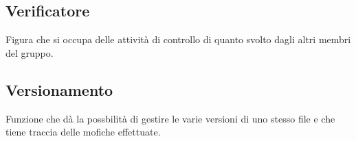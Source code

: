 \documentclass[../glossario.tex]{subfiles}
\begin{document}
\subsection*{Verificatore} 
Figura che si occupa delle attività di controllo di quanto svolto dagli altri membri del gruppo.

\subsection*{Versionamento} 
Funzione che dà la possbilità di gestire le varie versioni di uno stesso file e che tiene traccia delle mofiche effettuate.


    
\end{document}
